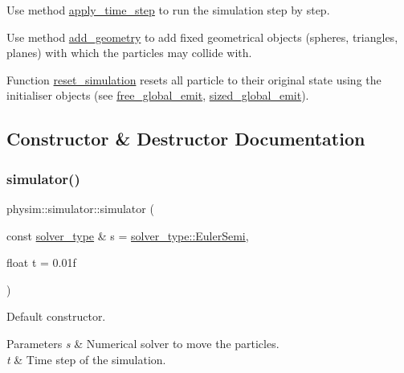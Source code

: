 Use method \hyperlink{classphysim_1_1simulator_a1bef71687a4b46373753847a5d2112ff}{apply\+\_\+time\+\_\+step} to run the simulation step by step.

Use method \hyperlink{classphysim_1_1simulator_a92a79231495f047789176a19857735ff}{add\+\_\+geometry} to add fixed geometrical objects (spheres, triangles, planes) with which the particles may collide with.

Function \hyperlink{classphysim_1_1simulator_a6d3a5491771496c3da2be7c3382f061b}{reset\+\_\+simulation} resets all particle to their original state using the initialiser objects (see \hyperlink{classphysim_1_1simulator_a05e2840fc39c644d7005ea938e63202f}{free\+\_\+global\+\_\+emit}, \hyperlink{classphysim_1_1simulator_a61d4f20480309e95fce1db56b7fc8a88}{sized\+\_\+global\+\_\+emit}). 

\subsection{Constructor \& Destructor Documentation}
\mbox{\label{classphysim_1_1simulator_ae89aeb2287bbf9bbb482f448e2ac375a}} 
\subsubsection{\texorpdfstring{simulator()}{simulator()}}
{\footnotesize\ttfamily physim\+::simulator\+::simulator (\begin{DoxyParamCaption}\item[{const \hyperlink{namespacephysim_a09adeda29c09e651877e880d31fc9686}{solver\+\_\+type} \&}]{s = {\ttfamily \hyperlink{namespacephysim_a09adeda29c09e651877e880d31fc9686a1855dee0fffde2f4ed8ef6c4a0420b30}{solver\+\_\+type\+::\+Euler\+Semi}},  }\item[{float}]{t = {\ttfamily 0.01f} }\end{DoxyParamCaption})}



Default constructor. 


\begin{DoxyParams}{Parameters}
{\em s} & Numerical solver to move the particles. \\
\hline
{\em t} & Time step of the simulation. \\
\hline
\end{DoxyParams}


